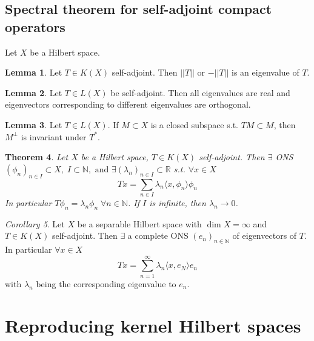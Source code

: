 \documentclass[a4paper, 12pt]{article}
\theoremstyle{plain}
\newtheorem{theorem}{Theorem}[subsection] %
\theoremstyle{definition}
\theoremstyle{lemma}
\newtheorem{lemma}[theorem]{Lemma}
\theoremstyle{remark}
\theoremstyle{corollary}
\newtheorem{corollary}[theorem]{Corollary}
\theoremstyle{example}
\begin{document}
	\subsection{Spectral theorem for self-adjoint compact operators}
	Let $X$ be a Hilbert space.
	\begin{lemma}
		Let $T \in K(X)$ self-adjoint. Then $||T||$ or $-||T||$ is an eigenvalue of $T$. 
	\end{lemma}
	\begin{lemma}
		Let $T \in L(X)$ be self-adjoint. Then all eigenvalues are real and eigenvectors corresponding to different eigenvalues are orthogonal.
	\end{lemma}
	\begin{lemma}
		Let $T \in L(X)$. If $M \subset X$ is a closed subspace s.t. $TM\subset M$, then $M^\bot$ is invariant under $T^*$.
	\end{lemma}
	\begin{theorem}
		Let $X$ be a Hilbert space, $T\in K(X)$ self-adjoint. Then $\exists$ ONS $ (\phi_n)_{n \in I} \subset X, \; I\subset \mathbb{N}, \text{ and } \exists (\lambda_n)_{n \in I} \subset \mathbb{R}$ s.t. $\forall x \in X$ \[Tx = \sum_{n \in I} \lambda_n \langle x, \phi_n\rangle \phi_n\] In particular $T\phi_n = \lambda_n \phi_n \; \forall n \in \mathbb{N}$. If $I$ is infinite, then $\lambda_n \to 0$.
	\end{theorem}
	\begin{corollary}
		Let $X$ be a separable Hilbert space with $\dim X = \infty$ and $T \in K(X)$ self-adjoint. Then $\exists$ a complete ONS $(e_n)_{n \in \mathbb{N}}$ of eigenvectors of $T$. In particular $\forall x \in X$ \[Tx = \sum_{n=1}^\infty \lambda_n \langle x,e_N\rangle e_n\]
		with $\lambda_n$ being the corresponding eigenvalue to $e_n$.
	\end{corollary}
	\section{Reproducing kernel Hilbert spaces}
\end{document}

